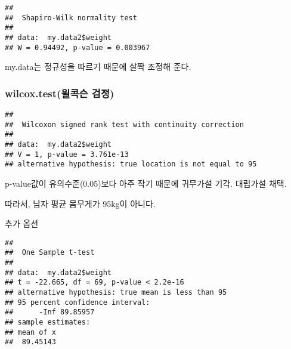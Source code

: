 \documentclass[
]{article}
\newenvironment{Shaded}{\begin{snugshade}}{\end{snugshade}}
\newcommand{\AttributeTok}[1]{\textcolor[rgb]{0.77,0.63,0.00}{#1}}
\newcommand{\DecValTok}[1]{\textcolor[rgb]{0.00,0.00,0.81}{#1}}
\newcommand{\FunctionTok}[1]{\textcolor[rgb]{0.00,0.00,0.00}{#1}}
\newcommand{\NormalTok}[1]{#1}
\newcommand{\SpecialCharTok}[1]{\textcolor[rgb]{0.00,0.00,0.00}{#1}}
\newcommand{\StringTok}[1]{\textcolor[rgb]{0.31,0.60,0.02}{#1}}
\begin{document}
\begin{Shaded}
\end{Shaded}

\begin{verbatim}
## 
##  Shapiro-Wilk normality test
## 
## data:  my.data2$weight
## W = 0.94492, p-value = 0.003967
\end{verbatim}

my.data는 정규성을 따르기 때문에 살짝 조정해 준다.

\hypertarget{wilcox.testuxc70cuxcf55uxc2a8-uxac80uxc815}{%
\subsubsection{wilcox.test(윌콕슨 검정)}\label{wilcox.testuxc70cuxcf55uxc2a8-uxac80uxc815}}

\begin{Shaded}
\end{Shaded}

\begin{verbatim}
## 
##  Wilcoxon signed rank test with continuity correction
## 
## data:  my.data2$weight
## V = 1, p-value = 3.761e-13
## alternative hypothesis: true location is not equal to 95
\end{verbatim}

p-value값이 유의수준(0.05)보다 아주 작기 때문에 귀무가설 기각. 대립가설 채택.

따라서, 남자 평균 몸무게가 95kg이 아니다.

추가 옵션

\begin{Shaded}
\end{Shaded}

\begin{verbatim}
## 
##  One Sample t-test
## 
## data:  my.data2$weight
## t = -22.665, df = 69, p-value < 2.2e-16
## alternative hypothesis: true mean is less than 95
## 95 percent confidence interval:
##      -Inf 89.85957
## sample estimates:
## mean of x 
##  89.45143
\end{verbatim}
\end{document}
